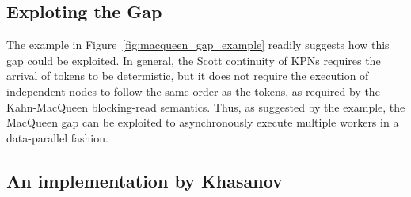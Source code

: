 \subsection{Exploting the Gap}
The example in Figure~\ref{fig:macqueen_gap_example} readily suggests how this gap could be exploited. In general, the Scott continuity of \acp{KPN} requires the arrival of tokens to be determistic, but it does not require the execution of independent nodes to follow the same order as the tokens, as required by the Kahn-MacQueen blocking-read semantics. Thus, as suggested by the example, the MacQueen gap can be exploited to asynchronously execute multiple workers in a data-parallel fashion.

\subsection{An implementation by Khasanov}
